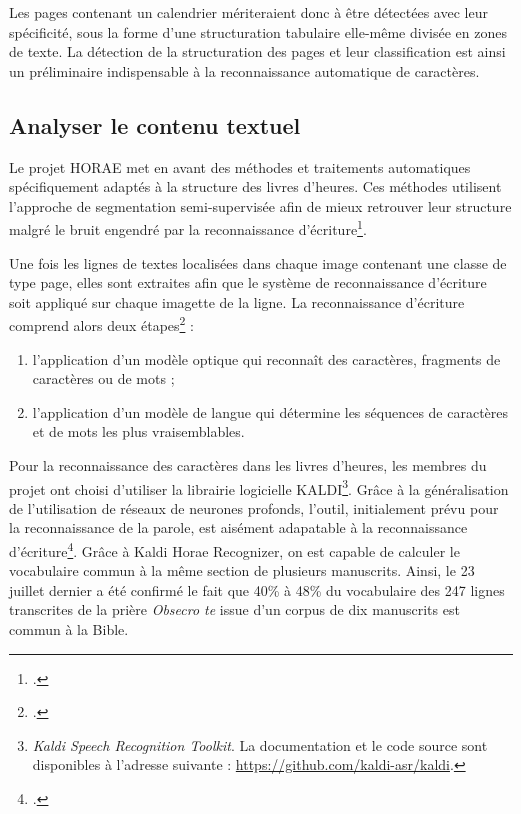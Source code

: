\documentclass[a4paper,12pt,twoside]{book}
\begin{document}
   Les pages contenant un calendrier mériteraient donc à être détectées avec leur spécificité, sous la forme d'une structuration tabulaire elle-même divisée en zones de texte. La détection de la structuration des pages et leur classification est ainsi un préliminaire indispensable à la reconnaissance automatique de caractères. 

	
	\subsection{Analyser le contenu textuel}
	
	Le projet HORAE met en avant des méthodes et traitements automatiques spécifiquement adaptés à la structure des livres d'heures. Ces méthodes utilisent l'approche de segmentation semi-supervisée afin de mieux retrouver leur structure malgré le bruit engendré par la reconnaissance d'écriture\footcite[p. 13]{Seg_Livres_Heures}. 
	
	Une fois les lignes de textes localisées dans chaque image contenant une classe de type \og page\fg{}, elles sont extraites afin que le système de reconnaissance d'écriture soit appliqué sur chaque imagette de la ligne. La reconnaissance d'écriture comprend alors deux étapes\footcite[p. 22]{Seg_Livres_Heures} : 
	\begin{enumerate}
	    \item l'application d'un modèle optique qui reconnaît des caractères, fragments de caractères ou de mots ;
	    \item l'application d'un modèle de langue qui détermine les séquences de caractères et de mots les plus vraisemblables.
	\end{enumerate}
	
	Pour la reconnaissance des caractères dans les livres d'heures, les membres du projet ont choisi d'utiliser la librairie logicielle KALDI\footnote{\textit{Kaldi Speech Recognition Toolkit}. La documentation et le code source sont disponibles à l'adresse suivante : \url{https://github.com/kaldi-asr/kaldi}.}. Grâce à la généralisation de l'utilisation de réseaux de neurones profonds, l'outil, initialement prévu pour la reconnaissance de la parole, est aisément adapatable à la reconnaissance d'écriture\footcite[p. 23]{Seg_Livres_Heures}. Grâce à Kaldi Horae Recognizer, on est capable de calculer le vocabulaire commun à la même section de plusieurs manuscrits. Ainsi, le 23 juillet dernier a été confirmé le fait que 40\% à 48\% du vocabulaire des 247 lignes transcrites de la prière \textit{Obsecro te} issue d'un corpus de dix manuscrits est commun à la Bible. \\
	
\end{document}
